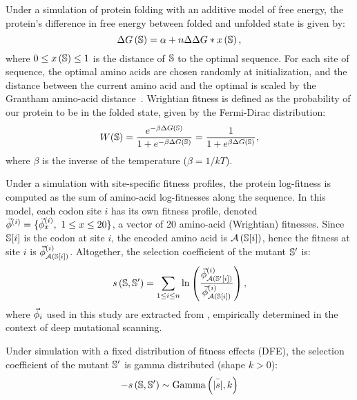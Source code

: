 Under a simulation of protein folding with an additive model of free energy, the protein's difference in free energy between folded and unfolded state is given by:
\begin{equation*}
    \Delta G\left(\mathbb{S}\right) = \alpha + n \Delta \Delta G * x\left(\mathbb{S}\right),
\end{equation*}
where $0 \leq x\left(\mathbb{S}\right) \leq 1$ is the distance of $\mathbb{S}$ to the optimal sequence.
For each site of sequence, the optimal amino acids are chosen randomly at initialization, and the distance between the current amino acid and the optimal is scaled by the Grantham amino-acid distance~\citep{Grantham1974}.
Wrightian fitness is defined as the probability of our protein to be in the folded state, given by the Fermi-Dirac distribution:
\begin{equation}
    W (\mathbb{S}) = \dfrac{e^{-\beta \Delta G\left(\mathbb{S}\right) }}{1 + e^{-\beta \Delta G\left(\mathbb{S}\right) }} = \dfrac{1}{1 + e^{\beta \Delta G\left(\mathbb{S}\right) }},
\end{equation}
where $\beta$ is the inverse of the temperature ($\beta=1/kT$).

Under a simulation with site-specific fitness profiles, the protein log-fitness is computed as the sum of amino-acid log-fitnesses along the sequence.
In this model, each codon site $i$ has its own fitness profile, denoted $\vec{\phi}^{(i)} = \{ \vec{\phi}^{(i)}_{x},\ 1 \leq x \leq 20 \}$, a vector of 20 amino-acid (Wrightian) fitnesses.
Since $\mathbb{S}[ i ]$ is the codon at site $i$, the encoded amino acid is $\mathcal{A} \left( \mathbb{S}[ i ] \right)$, hence the fitness at site $i$ is $\vec{\phi}^{(i)}_{\mathcal{A} \left( \mathbb{S}[ i ] \right)}$.
Altogether, the selection coefficient of the mutant $\mathbb{S}'$ is:
\begin{equation}
    s \left( \mathbb{S},\mathbb{S}'\right) = \sum\limits_{1 \leq i \leq n} \ln \left( \dfrac{\vec{\phi}^{(i)}_{\mathcal{A} \left( \mathbb{S}'[ i ] \right)}}{\vec{\phi}^{(i)}_{\mathcal{A} \left( \mathbb{S}[ i ] \right)}} \right),
\end{equation}
where $\vec{\phi}_{i}$ used in this study are extracted from \citet{Bloom2017}, empirically determined in the context of deep mutational scanning.

Under simulation with a fixed distribution of fitness effects (\acrshort{DFE}), the selection coefficient of the mutant $\mathbb{S}'$ is gamma distributed (shape $k > 0$):
\begin{equation}
    - s \left( \mathbb{S},\mathbb{S}'\right) \sim \text{Gamma} \left( \bar{|s|}, k \right)
\end{equation}

